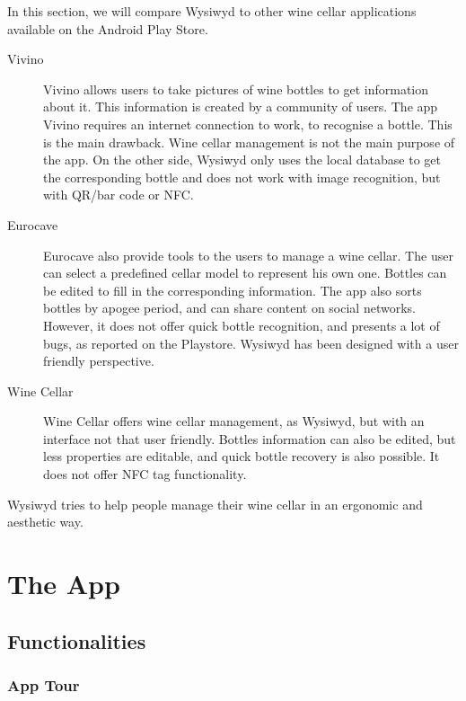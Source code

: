 In this section, we will compare Wysiwyd to other wine cellar applications available on the Android Play Store.

\begin{description}
	\item[Vivino] Vivino allows users to take pictures of wine bottles to get information about it. This information is created by a community of users. The app Vivino requires an internet connection to work, to recognise a bottle. This is the main drawback. Wine cellar management is not the main purpose of the app. On the other side, Wysiwyd only uses the local database to get the corresponding bottle and does not work with image recognition, but with QR/bar code or NFC.
	
	\item[Eurocave] Eurocave also provide tools to the users to manage a wine cellar. The user can select a predefined cellar model to represent his own one. Bottles can be edited to fill in the corresponding information. The app also sorts bottles by apogee period, and can share content on social networks. However, it does not offer quick bottle recognition, and presents a lot of bugs, as reported on the Playstore. Wysiwyd has been designed with a user friendly perspective.
	
	\item[Wine Cellar] Wine Cellar offers wine cellar management, as Wysiwyd, but with an interface not that user friendly. Bottles information can also be edited, but less properties are editable, and quick bottle recovery is also possible. It does not offer NFC tag functionality.
	
\end{description}

	Wysiwyd tries to help people manage their wine cellar in an ergonomic and aesthetic way.

\newpage
\section{The App}

\subsection{Functionalities}

\subsubsection{App Tour}

